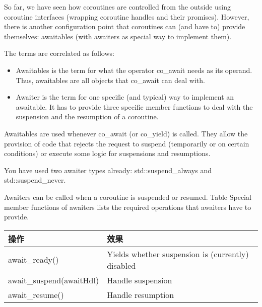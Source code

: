 

So far, we have seen how coroutines are controlled from the outside using coroutine interfaces (wrapping coroutine handles and their promises). However, there is another configuration point that coroutines can (and have to) provide themselves: awaitables (with awaiters as special way to implement them).

The terms are correlated as follows:

\begin{itemize}
\item 
Awaitables is the term for what the operator co\_await needs as its operand. Thus, awaitables are all objects that co\_await can deal with.

\item 
Awaiter is the term for one specific (and typical) way to implement an awaitable. It has to provide three specific member functions to deal with the suspension and the resumption of a coroutine.
\end{itemize}

Awaitables are used whenever co\_await (or co\_yield) is called. They allow the provision of code that rejects the request to suspend (temporarily or on certain conditions) or execute some logic for suspensions and resumptions.

You have used two awaiter types already: std::suspend\_always and std::suspend\_never.


Awaiters can be called when a coroutine is suspended or resumed. Table Special member functions of awaiters lists the required operations that awaiters have to provide.

\begin{longtable}[c]{|l|l|}
\hline
\textbf{操作}       & \textbf{效果}                                   \\ \hline
\endfirsthead
%
\endhead
%
await\_ready()           & Yields whether suspension is (currently) disabled \\ \hline
await\_suspend(awaitHdl) & Handle suspension                                 \\ \hline
await\_resume()          & Handle resumption                                 \\ \hline
\end{longtable}

